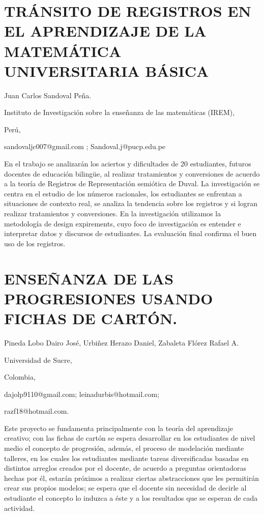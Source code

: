 \section{TRÁNSITO DE REGISTROS EN EL APRENDIZAJE DE LA MATEMÁTICA UNIVERSITARIA
BÁSICA}

\begin{datos}

Juan Carlos Sandoval Peña.

Instituto de Investigación sobre la enseñanza de las matemáticas (IREM),

Perú,

sandovaljc007@gmail.com ; Sandoval.j@pucp.edu.pe 

\end{datos}

En el trabajo se analizarán los aciertos y dificultades de 20 estudiantes,
futuros docentes de educación bilingüe, al realizar tratamientos y
conversiones de acuerdo a la teoría de Registros de Representación
semiótica de Duval. La investigación se centra en el estudio de los
números racionales, los estudiantes se enfrentan a situaciones de
contexto real, se analiza la tendencia sobre los registros y si logran
realizar tratamientos y conversiones. En la investigación utilizamos
la metodología de design expirements, cuyo foco de investigación es
entender e interpretar datos y discursos de estudiantes. La evaluación
final confirma el buen uso de los registros. 


\section{ENSEÑANZA DE LAS PROGRESIONES USANDO FICHAS DE CARTÓN.}

\begin{datos}

Pineda Lobo Dairo José, Urbiñez Herazo Daniel, Zabaleta Flórez Rafael
A. 

Universidad de Sucre, 

Colombia,

dajolp9110@gmail.com; leinadurbis@hotmail.com;

razf18@hotmail.com. 

\end{datos}

Este proyecto se fundamenta principalmente con la teoría del aprendizaje
creativo; con las fichas de cartón se espera desarrollar en los estudiantes
de nivel medio el concepto de progresión, además, el proceso de modelación
mediante talleres, en los cuales los estudiantes mediante tareas diversificadas
basadas en distintos arreglos creados por el docente, de acuerdo a
preguntas orientadoras hechas por él, estarán próximos a realizar
ciertas abstracciones que les permitirán crear sus propios modelos;
se espera que el docente sin necesidad de decirle al estudiante el
concepto lo induzca a éste y a los resultados que se esperan de cada
actividad.


